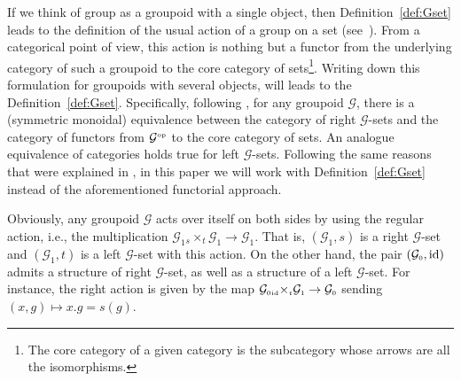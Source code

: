 \documentclass[pdftex]{sigma}
\numberwithin{equation}{section}
\newcommand{\Go}{\cG_{\Sscript{0}}}
\newcommand{\Ga}{\cG_{\Sscript{1}}}
\newcommand{\cG}{{\mathcal G}}
\newcommand{\Sscript}[1]{\scriptscriptstyle{#1}}
\newcommand{\due}[3]{{}_{{#2 }} {#1}_{{ #3}} }
\begin{document}
\begin{Remark}\label{rem:GrpdSets}If we think of group as a groupoid with a single object, then Definition~\ref{def:Gset} leads to the definition of the usual action of a group on a set (see~\cite{Bouc:2010}). From a categorical point of view, this action is nothing but a functor from the underlying category of such a groupoid to the core category of sets\footnote{The core category of a given category is the subcategory whose arrows are all the isomorphisms.}. Writing down this formulation for groupoids with several objects, will leads to the Definition~\ref{def:Gset}. Specifically, following \cite[Remark~2.6]{Kaoutit/Spinosa:2018}, for any groupoid $\cG$, there is a (symmetric monoidal) equivalence between the category of right $\cG$-sets and the category of functors from $\cG^{\Sscript{\rm op}}$ to the core category of sets. An analogue equivalence of categories holds true for left $\cG$-sets. Following the same reasons that were explained in \cite[Remark 2.6, Section~5.3]{Kaoutit/Spinosa:2018}, in this paper we will work with Definition~\ref{def:Gset} instead of the aforementioned functorial approach.
\end{Remark}

Obviously, any groupoid $\cG$ acts over itself on both sides by using the regular action, i.e., the multiplication $\Ga \due \times {\Sscript{{s}}} { \Sscript{{t}}} \Ga \to \Ga$. That is, $(\Ga, {s})$ is a right $\cG$-set and $(\Ga, {t})$ is a left $\cG$-set with this action. On the other hand, the pair $(\Go, {\rm id})$ admits a structure of right $\cG$-set, as well as a structure of a left $\cG$-set. For instance, the right action is given by the map $\Go \due \times {\Sscript{{\rm id}}} { \Sscript{{t}}} \Ga \to \Go$ sending $(x,g) \mapsto x . g= s(g)$.
\end{document}
